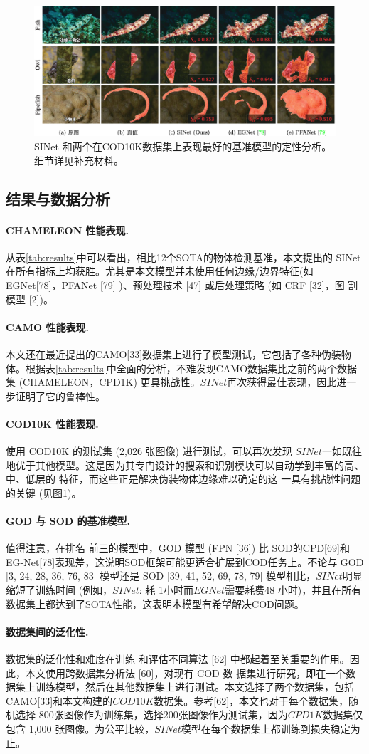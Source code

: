 \documentclass[final]{cvpr}
\newcommand{\mypara}[1]{\paragraph{#1.}}
\renewcommand{\figref}[1]{图\ref{#1}}
\renewcommand{\tabref}[1]{表\ref{#1}}
\begin{document}
\begin{figure}
    \centering
    \includegraphics[width=\textwidth]{COD_Zh_translate/figures/Comparesion_SINet_EGNet_PFANet.png}\small
    \caption{SINet 和两个在COD10K数据集上表现最好的基准模型的定性分析。细节详见补充材料。}
    \label{fig:Comparesion_SINet_EGNet_PFANet}
\end{figure}

\subsection{结果与数据分析}
\mypara{CHAMELEON 性能表现}从\tabref{tab:results}中可以看出，相比12个SOTA的物体检测基准，本文提出的 SINet 在所有指标上均获胜。尤其是本文模型并未使用任何边缘/边界特征(如EGNet[78]，PFANet [79] )、预处理技术 [47] 或后处理策略 (如 CRF [32]，图 割模型 [2])。
\mypara{CAMO 性能表现}本文还在最近提出的CAMO[33]数据集上进行了模型测试，它包括了各种伪装物 体。根据\tabref{tab:results}中全面的分析，不难发现CAMO数据集比之前的两个数据集 (CHAMELEON，CPD1K) 更具挑战性。$SINet$再次获得最佳表现，因此进一步证明了它的鲁棒性。
\mypara{COD10K 性能表现}使用 COD10K 的测试集 (2,026 张图像) 进行测试，可以再次发现 $SINet$一如既往地优于其他模型。这是因为其专门设计的搜索和识别模块可以自动学到丰富的高、中、低层的 特征，而这些正是解决伪装物体边缘难以确定的这 一具有挑战性问题的关键 (见\figref{fig:Comparesion_SINet_EGNet_PFANet})。
\mypara{GOD 与 SOD 的基准模型}值得注意，在排名 前三的模型中，GOD 模型 (FPN [36]) 比 SOD的CPD[69]和EG-Net[78]表现差，这说明SOD框架可能更适合扩展到COD任务上。不论与 GOD [3, 24, 28, 36, 76, 83] 模型还是 SOD [39, 41, 52, 69, 78, 79]
模型相比，$SINet$明显缩短了训练时间 (例如，$SINet$: 耗 1小时而$EGNet$需要耗费48 小时)，并且在所有数据集上都达到了SOTA性能，这表明本模型有希望解决COD问题。
\mypara{数据集间的泛化性}数据集的泛化性和难度在训练 和评估不同算法 [62] 中都起着至关重要的作用。因 此，本文使用跨数据集分析法 [60]，对现有 COD 数 据集进行研究，即在一个数据集上训练模型，然后在其他数据集上进行测试。本文选择了两个数据集，包括 CAMO[33]和本文构建的$COD10K$数据集。参考[62]，本文也对于每个数据集，随机选择 800张图像作为训练集，选择200张图像作为测试集，因为$CPD1K$数据集仅包含 1,000 张图像。为公平比较，$SINet$模型在每个数据集上都训练到损失稳定为止。
\end{document}
